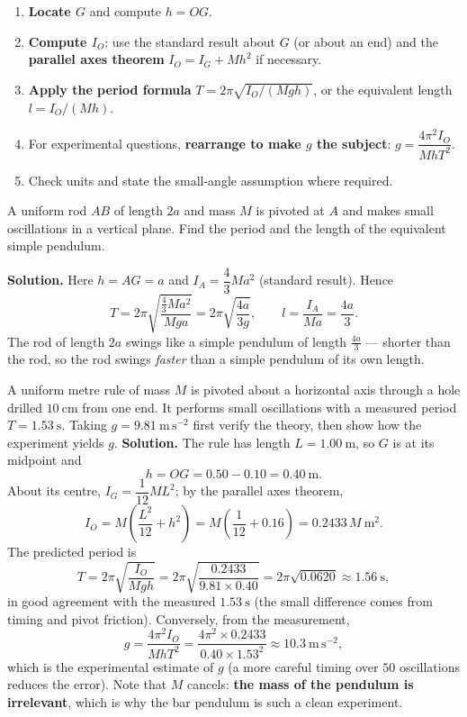 \documentclass[11pt]{article}
\newcounter{popsec}
\newcounter{popsub}
\newcommand{\courssub}[1]{%
  \stepcounter{popsub}%
  \par\vspace{9pt}\noindent{\popxbold\fontsize{11.5}{13}\selectfont\color{popink}{\color{poporange}\thepopsec.\thepopsub}\hspace{6pt}#1}\par\nopagebreak\vspace{4pt}
}
\begin{document}
\courssub{Worked Method and Examples}

\begin{methode}
\begin{enumerate}
\item \textbf{Locate $G$} and compute $h = OG$.
\item \textbf{Compute $I_O$}: use the standard result about $G$ (or about an end) and the \textbf{parallel axes theorem} $I_O = I_G + Mh^2$ if necessary.
\item \textbf{Apply the period formula} $T = 2\pi\sqrt{I_O/(Mgh)}$, or the equivalent length $l = I_O/(Mh)$.
\item For experimental questions, \textbf{rearrange to make $g$ the subject}: $g = \dfrac{4\pi^2 I_O}{MhT^2}$.
\item Check units and state the small-angle assumption where required.
\end{enumerate}
\end{methode}

\begin{exemplebox}
A uniform rod $AB$ of length $2a$ and mass $M$ is pivoted at $A$ and makes small oscillations in a vertical plane. Find the period and the length of the equivalent simple pendulum.

\textbf{Solution.} Here $h = AG = a$ and $I_A = \dfrac{4}{3}Ma^2$ (standard result). Hence
\[ T = 2\pi\sqrt{\frac{\tfrac{4}{3}Ma^2}{Mga}} = 2\pi\sqrt{\frac{4a}{3g}}, \qquad l = \frac{I_A}{Ma} = \frac{4a}{3}. \]
The rod of length $2a$ swings like a simple pendulum of length $\tfrac{4a}{3}$ — shorter than the rod, so the rod swings \emph{faster} than a simple pendulum of its own length.
\end{exemplebox}

\begin{exoresolu}
A uniform metre rule of mass $M$ is pivoted about a horizontal axis through a hole drilled $10\ \mathrm{cm}$ from one end. It performs small oscillations with a measured period $T = 1.53\ \mathrm{s}$. Taking $g = 9.81\ \mathrm{m\,s^{-2}}$ first verify the theory, then show how the experiment yields $g$.
\tcblower
\textbf{Solution.} The rule has length $L = 1.00\ \mathrm{m}$, so $G$ is at its midpoint and
\[ h = OG = 0.50 - 0.10 = 0.40\ \mathrm{m}. \]
About its centre, $I_G = \dfrac{1}{12}ML^2$; by the parallel axes theorem,
\[ I_O = M\left(\frac{L^2}{12} + h^2\right) = M\left(\frac{1}{12} + 0.16\right) = 0.2433\,M\ \mathrm{m^2}. \]
The predicted period is
\[ T = 2\pi\sqrt{\frac{I_O}{Mgh}} = 2\pi\sqrt{\frac{0.2433}{9.81 \times 0.40}} = 2\pi\sqrt{0.0620} \approx 1.56\ \mathrm{s}, \]
in good agreement with the measured $1.53\ \mathrm{s}$ (the small difference comes from timing and pivot friction). Conversely, from the measurement,
\[ g = \frac{4\pi^2 I_O}{MhT^2} = \frac{4\pi^2 \times 0.2433}{0.40 \times 1.53^2} \approx 10.3\ \mathrm{m\,s^{-2}}, \]
which is the experimental estimate of $g$ (a more careful timing over $50$ oscillations reduces the error). Note that $M$ cancels: \textbf{the mass of the pendulum is irrelevant}, which is why the bar pendulum is such a clean experiment.
\end{exoresolu}
\end{document}
